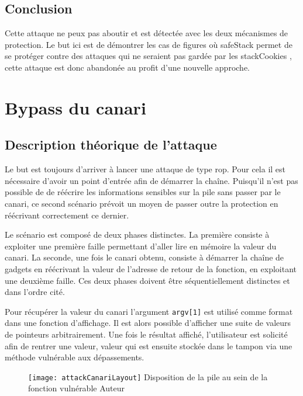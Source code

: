 \subsection{Conclusion}

Cette attaque ne peux pas aboutir et est détectée avec les deux mécanismes de protection. Le but ici est de démontrer les cas de figures où \og \gls{safeStack} \fg permet de se protéger contre des attaques qui ne seraient pas gardée par les \og \gls{stackCookies} \fg, cette attaque est donc abandonée au profit d'une nouvelle approche.


\section{Bypass du canari}

\subsection{Description théorique de l'attaque}

Le but est toujours d'arriver à lancer une attaque de type \gls{rop}. Pour cela il est
nécessaire d'avoir un point d'entrée afin de démarrer la chaîne. Puisqu'il n'est pas
possible de de réécrire les informations sensibles sur la pile sans passer par le
canari, ce second scénario prévoit un moyen de passer outre la protection en
réécrivant correctement ce dernier.

Le scénario est composé de deux phases distinctes. La première consiste à exploiter
une première faille permettant d'aller lire en mémoire la valeur du canari. La
seconde, une fois le canari obtenu, consiste à démarrer la chaîne de gadgets en
réécrivant la valeur de l'adresse de retour de la fonction, en exploitant une deuxième
faille. Ces deux phases doivent être séquentiellement distinctes et dans l'ordre cité.

Pour récupérer la valeur du canari l'argument \texttt{argv[1]} est utilisé comme
format dans une fonction d'affichage. Il est alors possible d'afficher une suite de
valeurs de pointeurs arbitrairement. Une fois le résultat affiché, l'utilisateur est
solicité afin de rentrer une valeur, valeur qui est ensuite stockée dans le tampon via
une méthode vulnérable aux dépassements.

\begin{figure}[H]
	\centering
	\texttt{[image: attackCanariLayout]}
	{Disposition de la pile au sein de la fonction vulnérable}
	{Auteur}
	\label{fig:attackCanariLayout}
\end{figure}

